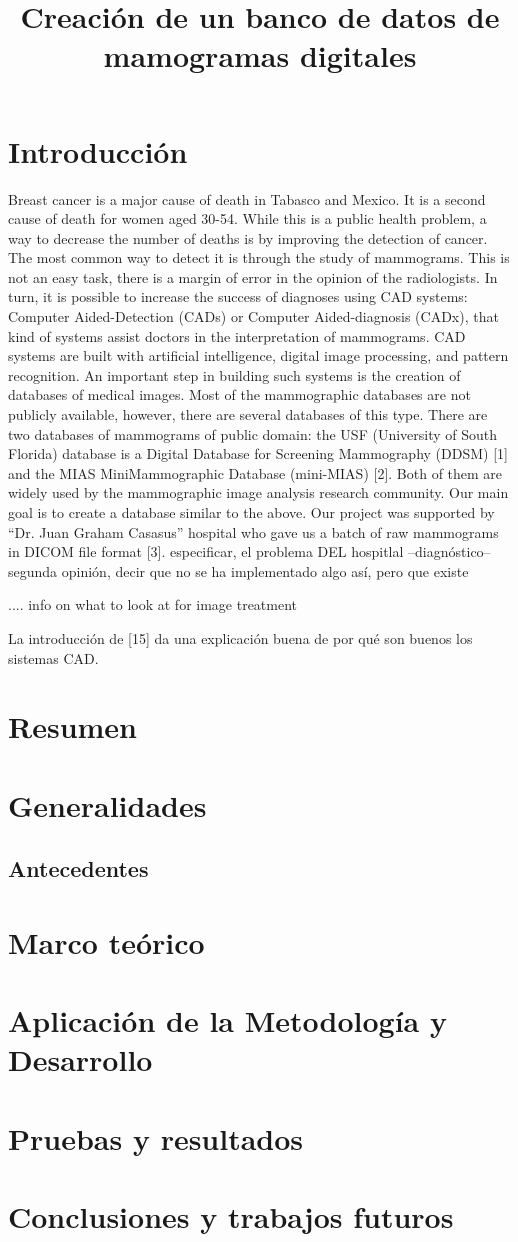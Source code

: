 \documentclass[11pt, a4paper, oneside]{book}
\begin{document}
\title{Creación de un banco de datos de mamogramas digitales}
\maketitle
\tableofcontents

\chapter{Introducción}

Breast cancer is a major cause of death in Tabasco and Mexico. It is a second
cause of death for women aged 30-54. While this is a public health problem, a
way to decrease the number of deaths is by improving the detection of cancer.
The most common way to detect it is through the study of mammograms. This is
not an easy task, there is a margin of error in the opinion of the
radiologists.  In turn, it is possible to increase the success of diagnoses
using CAD systems: Computer Aided-Detection (CADs) or Computer Aided-diagnosis
(CADx), that kind of systems assist doctors in the interpretation of
mammograms. CAD systems are built with artificial intelligence, digital image
processing, and pattern recognition.  An important step in building such
systems is the creation of databases of medical images. Most of the
mammographic databases are not publicly available, however, there are several
databases of this type. There are two databases of mammograms of public domain:
the USF (University of South Florida) database is a Digital Database for
Screening Mammography (DDSM) [1] and the MIAS MiniMammographic Database
(mini-MIAS) [2]. Both of them are widely used by the mammographic image
analysis research community.  Our main goal is to create a database similar to
the above.  Our project was supported by “Dr. Juan Graham Casasus” hospital who
gave us a batch of raw mammograms in DICOM file format [3].  especificar, el
problema DEL hospitlal --diagnóstico-- segunda opinión, decir que no se ha
implementado algo así, pero que existe
 

.... info on what to look at for image treatment 

La introducción de [15] da una explicación buena de por qué son buenos los
sistemas CAD.

\chapter{Resumen}
\chapter{Generalidades}
\section{Antecedentes}
\chapter{Marco teórico}
\chapter{Aplicación de la Metodología y Desarrollo}
\chapter{Pruebas y resultados}
\chapter{Conclusiones y trabajos futuros}
\end{document}
